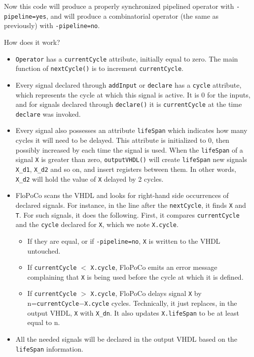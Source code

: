 \documentclass{article}
\begin{document}
Now this code will produce a properly synchronized pipelined operator
with \verb!-pipeline=yes!, and will produce a combinatorial operator
(the same as previously) with \verb!-pipeline=no!.

How does it work? 
\begin{itemize}\item 
  \verb!Operator! has a \verb!currentCycle! attribute, initially equal to
  zero. The main function of 	\verb!nextCycle()! is to increment \verb!currentCycle!.

\item Every signal declared through \verb!addInput! or \verb!declare!
  has a \verb!cycle! attribute, which represents the cycle at which
  this signal is active. It is 0 for the inputs, and for signals
  declared through \verb!declare()! it is \verb!currentCycle!  at the
  time \verb!declare! was invoked.

\item Every signal also possesses an attribute \verb!lifeSpan! which
  indicates how many cycles it will need to be delayed. This attribute
  is initialized to 0, then possibly increased by each time the signal is used.
  When the \verb!lifeSpan! of a signal \verb!X!  is
  greater than zero, \verb!outputVHDL()! will create \verb!lifeSpan!
  new signals \verb!X_d1!, \verb!X_d2! and so on, and insert registers
  between them. In other words, \verb!X_d2! will hold the value of
  \verb!X! delayed by 2 cycles.

\item FloPoCo scans the VHDL and looks for right-hand side occurrences
  of declared signals. For instance, in the line after the
  \verb!nextCycle!, it finds \verb!X! and \verb!T!. For such signals, it does the following. First,
  it compares \verb!currentCycle! and the
  \verb!cycle! declared for \verb!X!, which we note \verb!X.cycle!.
  \begin{itemize}\item 
    If they are equal, or if \verb!-pipeline=no!, \verb!X! is written to the VHDL untouched.
  \item If \verb!currentCycle! $<$ \verb!X.cycle!, FloPoCo emits an error message complaining that \verb!X! is being
    used before the cycle at which it is defined.
  \item If \verb!currentCycle! $>$ \verb!X.cycle!, FloPoCo delays
    signal \verb!X! by n=\verb!currentCycle!$-$\verb!X.cycle!
    cycles. Technically, it just replaces, in the output VHDL,
    \verb!X! with \verb!X_dn!. It also updates \verb!X.lifeSpan! to be
    at least equal to n.
  \end{itemize}
\item All the needed signals will be declared in the output VHDL based
  on the \verb!lifeSpan! information.
\end{itemize}
\end{document}
